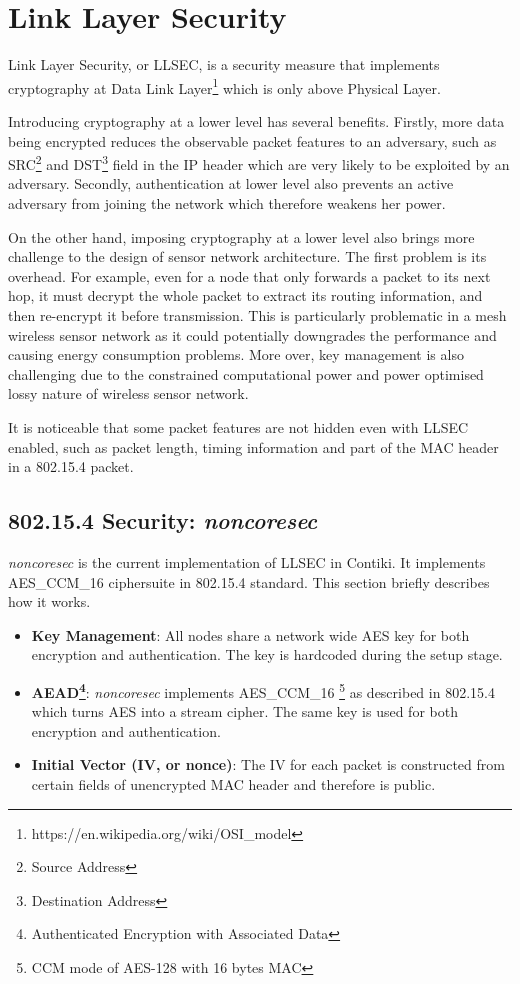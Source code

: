 \chapter{Link Layer Security} \label{Chp: LLSEC}

Link Layer Security, or LLSEC, is a security measure that implements cryptography at Data Link Layer\footnote{https://en.wikipedia.org/wiki/OSI\_model} which is only above Physical Layer.

Introducing cryptography at a lower level has several benefits. Firstly, more data being encrypted reduces the observable packet features to an adversary, such as SRC\footnote{Source Address} and DST\footnote{Destination Address} field in the IP header which are very likely to be exploited by an adversary. Secondly, authentication at lower level also prevents an active adversary from joining the network which therefore weakens her power. 

On the other hand, imposing cryptography at a lower level also brings more challenge to the design of sensor network architecture. The first problem is its overhead. For example, even for a node that only forwards a packet to its next hop, it must decrypt the whole packet to extract its routing information, and then re-encrypt it before transmission. This is particularly problematic in a mesh wireless sensor network as it could potentially downgrades the performance and causing energy consumption problems. More over, key management is also challenging due to the constrained computational power and power optimised lossy nature of wireless sensor network.

It is noticeable that some packet features are not hidden even with LLSEC enabled, such as packet length, timing information and part of the MAC header in a 802.15.4 packet.

\section{802.15.4 Security: {\it noncoresec}} \label{sec: noncoresec}
{\it noncoresec}\cite{LLSEC} is the current implementation of LLSEC in Contiki. It implements AES\_CCM\_16 ciphersuite in 802.15.4 standard. This section briefly describes how it works.

\begin{itemize}
\item {\bf Key Management}: All nodes share a network wide AES key for both encryption and authentication. The key is hardcoded during the setup stage.

\item{\bf AEAD\footnote{Authenticated Encryption with Associated Data}}: {\it noncoresec} implements AES\_CCM\_16 \footnote{CCM mode of AES-128 with 16 bytes MAC} as described in 802.15.4\cite{802154} which turns AES into a stream cipher. The same key is used for both encryption and authentication.

\item{\bf Initial Vector (IV, or nonce)}: The IV for each packet is constructed from certain fields of unencrypted MAC header and therefore is public.
\end{itemize}

